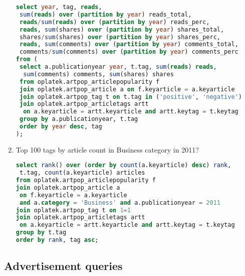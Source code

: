 \begin{enumerate}
\begin{lstlisting}[language=sql]
select year, tag, reads, 
 sum(reads) over (partition by year) reads_total, 
 reads/sum(reads) over (partition by year) reads_perc,
 reads, sum(shares) over (partition by year) shares_total, 
 shares/sum(shares) over (partition by year) shares_perc,
 reads, sum(comments) over (partition by year) comments_total, 
 comments/sum(comments) over (partition by year) comments_perc
from (
 select a.publicationyear year, t.tag, sum(reads) reads, 
  sum(comments) comments, sum(shares) shares
 from oplatek.artpop_articlepopularity f
 join oplatek.artpop_article a on f.keyarticle = a.keyarticle
 join oplatek.artpop_tag t on t.tag in ('positive', 'negative')
 join oplatek.artpop_articletags artt 
  on a.keyarticle = artt.keyarticle and artt.keytag = t.keytag 
 group by a.publicationyear, t.tag
 order by year desc, tag
);
\end{lstlisting}
\item   Top 100 tags by article count in Business category in 2011?
\begin{lstlisting}[language=sql] 
select rank() over (order by count(a.keyarticle) desc) rank, 
 t.tag, count(a.keyarticle) articles
from oplatek.artpop_articlepopularity f
join oplatek.artpop_article a 
 on f.keyarticle = a.keyarticle 
 and a.category = 'Business' and a.publicationyear = 2011
join oplatek.artpop_tag t on 1=1
join oplatek.artpop_articletags artt 
 on a.keyarticle = artt.keyarticle and artt.keytag = t.keytag
group by t.tag
order by rank, tag asc;
\end{lstlisting}
\end{enumerate}

\subsection*{Advertisement  queries} %
\label{sub:Advertisement queries}


